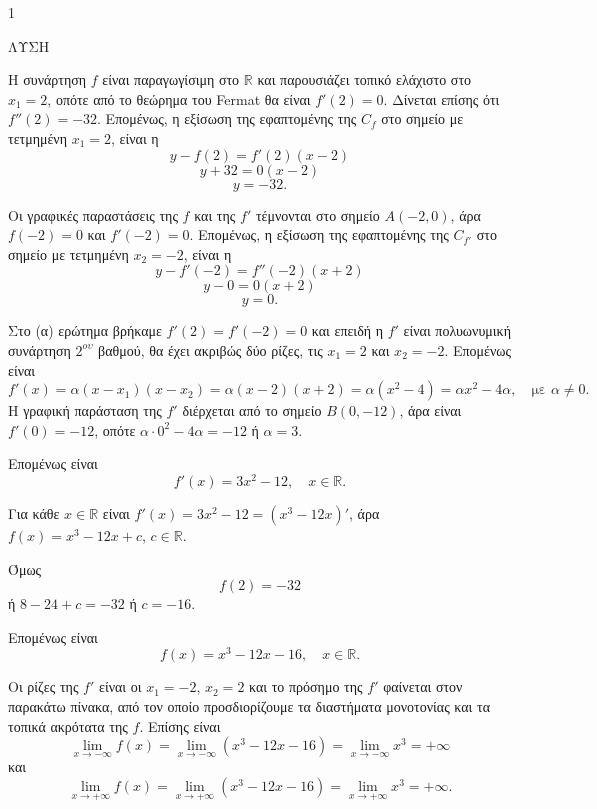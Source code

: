 \begin{ylh}{1}
    \item [Ύλη από εικόνα]
\end{ylh}
ΛΥΣΗ
\begin{alist}
    \item \begin{rlist}
        \item Η συνάρτηση $f$ είναι παραγωγίσιμη στο $\mathbb{R}$ και παρουσιάζει τοπικό ελάχιστο στο $x_1=2$, οπότε από το θεώρημα του Fermat θα είναι $f'(2)=0$. Δίνεται επίσης ότι $f''(2)=-32$. Επομένως, η εξίσωση της εφαπτομένης της $C_f$ στο σημείο με τετμημένη $x_1=2$, είναι η
        \[ y - f(2) = f'(2)(x - 2) \]
        \[ y + 32 = 0(x - 2) \]
        \[ y = -32. \]
        \item Οι γραφικές παραστάσεις της $f$ και της $f'$ τέμνονται στο σημείο $A(-2,0)$, άρα $f(-2)=0$ και $f'(-2)=0$. Επομένως, η εξίσωση της εφαπτομένης της $C_{f'}$ στο σημείο με τετμημένη $x_2=-2$, είναι η
        \[ y - f'(-2) = f''(-2)(x + 2) \]
        \[ y - 0 = 0(x + 2) \]
        \[ y = 0. \]
    \end{rlist}
    \item \begin{rlist}
        \item Στο (α) ερώτημα βρήκαμε $f'(2)=f'(-2)=0$ και επειδή η $f'$ είναι πολυωνυμική συνάρτηση $2^{ου}$ βαθμού, θα έχει ακριβώς δύο ρίζες, τις $x_1=2$ και $x_2=-2$. Επομένως είναι
        \[ f'(x) = \alpha(x-x_1)(x-x_2) = \alpha(x-2)(x+2) = \alpha(x^2-4) = \alpha x^2 - 4\alpha, \quad \text{με } \alpha \ne 0. \]
        Η γραφική παράσταση της $f'$ διέρχεται από το σημείο $B(0,-12)$, άρα είναι $f'(0)=-12$, οπότε $\alpha \cdot 0^2 - 4\alpha = -12$ ή $\alpha=3$.

        Επομένως είναι
        \[ f'(x) = 3x^2 - 12, \quad x \in \mathbb{R}. \]
        \item Για κάθε $x \in \mathbb{R}$ είναι $f'(x) = 3x^2 - 12 = (x^3 - 12x)'$, άρα $f(x) = x^3 - 12x + c$, $c \in \mathbb{R}$.

        Όμως
        \[ f(2) = -32 \]
        ή $8 - 24 + c = -32$
        ή $c = -16$.

        Επομένως είναι
        \[ f(x) = x^3 - 12x - 16, \quad x \in \mathbb{R}. \]
        \item Οι ρίζες της $f'$ είναι οι $x_1 = -2$, $x_2 = 2$ και το πρόσημο της $f'$ φαίνεται στον παρακάτω πίνακα, από τον οποίο προσδιορίζουμε τα διαστήματα μονοτονίας και τα τοπικά ακρότατα της $f$. Επίσης είναι
        \[ \lim_{x \to -\infty} f(x) = \lim_{x \to -\infty} (x^3 - 12x - 16) = \lim_{x \to -\infty} x^3 = +\infty \]
        και
        \[ \lim_{x \to +\infty} f(x) = \lim_{x \to +\infty} (x^3 - 12x - 16) = \lim_{x \to +\infty} x^3 = +\infty. \]
    \end{rlist}
\end{alist}
